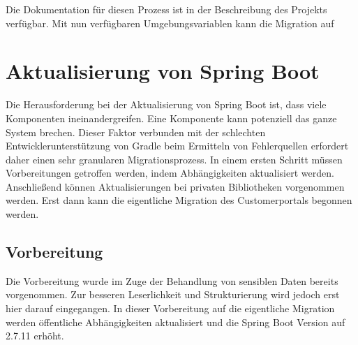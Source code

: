 Die Dokumentation für diesen Prozess ist in der Beschreibung des Projekts verfügbar. Mit nun verfügbaren Umgebungsvariablen kann die Migration auf 

\section{Aktualisierung von Spring Boot}

Die Herausforderung bei der Aktualisierung von Spring Boot ist, dass viele Komponenten ineinandergreifen. Eine Komponente kann potenziell das ganze System brechen. Dieser Faktor verbunden mit der schlechten Entwicklerunterstützung von Gradle beim Ermitteln von Fehlerquellen erfordert daher einen sehr granularen Migrationsprozess. In einem ersten Schritt müssen Vorbereitungen getroffen werden, indem Abhängigkeiten aktualisiert werden. Anschließend können Aktualisierungen bei privaten Bibliotheken vorgenommen werden. Erst dann kann die eigentliche Migration des Customerportals begonnen werden.

\subsection{Vorbereitung}

Die Vorbereitung wurde im Zuge der Behandlung von sensiblen Daten bereits vorgenommen. Zur besseren Leserlichkeit und Strukturierung wird jedoch erst hier darauf eingegangen. In dieser Vorbereitung auf die eigentliche Migration werden öffentliche Abhängigkeiten aktualisiert und die Spring Boot Version auf 2.7.11 erhöht.

